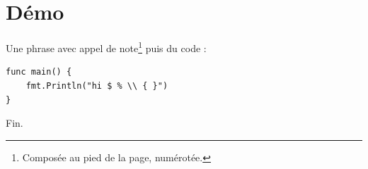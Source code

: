 \documentclass{article}
\begin{document}
\hsize=380pt
\section{D\'emo}
Une phrase avec appel de note\footnote{Composée au pied de la page, num\'erot\'ee.} puis du code :
\begin{verbatim}
func main() {
    fmt.Println("hi $ % \\ { }")
}
\end{verbatim}
Fin.
\end{document}
